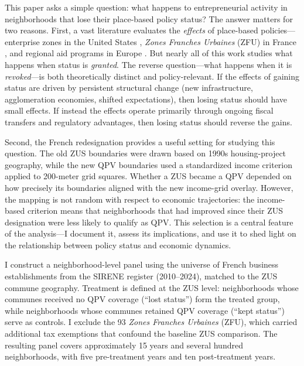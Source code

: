 \documentclass[12pt]{article}
\begin{document}
This paper asks a simple question: what happens to entrepreneurial activity in neighborhoods that lose their place-based policy status? The answer matters for two reasons. First, a vast literature evaluates the \textit{effects} of place-based policies---enterprise zones in the United States \citep{busso2013assessing, neumark2015enterprise, ham2011government}, \textit{Zones Franches Urbaines} (ZFU) in France \citep{mayer2017effects, givord2013zones, briant2015railroad}, and regional aid programs in Europe \citep{criscuolo2019some}. But nearly all of this work studies what happens when status is \textit{granted}. The reverse question---what happens when it is \textit{revoked}---is both theoretically distinct and policy-relevant. If the effects of gaining status are driven by persistent structural change (new infrastructure, agglomeration economies, shifted expectations), then losing status should have small effects. If instead the effects operate primarily through ongoing fiscal transfers and regulatory advantages, then losing status should reverse the gains.

Second, the French redesignation provides a useful setting for studying this question. The old ZUS boundaries were drawn based on 1990s housing-project geography, while the new QPV boundaries used a standardized income criterion applied to 200-meter grid squares. Whether a ZUS became a QPV depended on how precisely its boundaries aligned with the new income-grid overlay. However, the mapping is not random with respect to economic trajectories: the income-based criterion means that neighborhoods that had improved since their ZUS designation were less likely to qualify as QPV. This selection is a central feature of the analysis---I document it, assess its implications, and use it to shed light on the relationship between policy status and economic dynamics.

I construct a neighborhood-level panel using the universe of French business establishments from the SIRENE register (2010--2024), matched to the ZUS commune geography. Treatment is defined at the ZUS level: neighborhoods whose communes received no QPV coverage (``lost status'') form the treated group, while neighborhoods whose communes retained QPV coverage (``kept status'') serve as controls. I exclude the 93 \textit{Zones Franches Urbaines} (ZFU), which carried additional tax exemptions that confound the baseline ZUS comparison. The resulting panel covers approximately 15 years and several hundred neighborhoods, with five pre-treatment years and ten post-treatment years.
\end{document}
